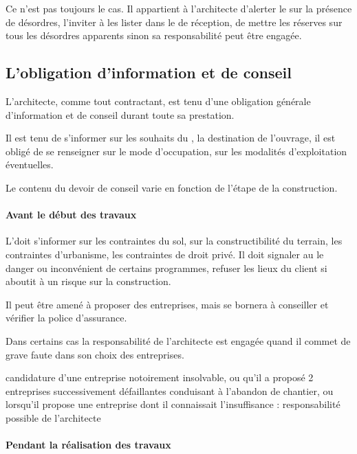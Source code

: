 		Ce n’est pas toujours le cas.
		Il appartient à l’architecte d’alerter le \Mo sur la présence de désordres, l’inviter à les lister dans le \pv de réception, de mettre les réserves sur tous les désordres apparents sinon sa responsabilité peut être engagée.

	\subsection{L'obligation d'information et de conseil}

		L’architecte, comme tout contractant, est tenu d’une obligation générale d’information et de conseil durant toute sa prestation.


		Il est tenu de s’informer sur les souhaits du \Mo, la destination de l’ouvrage, il est obligé de se renseigner sur le mode d’occupation, sur les modalités d’exploitation éventuelles.


		Le contenu du devoir de conseil varie en fonction de l’étape de la construction.


		\paragraph{Avant le début des travaux}
		L'\archi doit s'informer  sur les contraintes du sol, sur la constructibilité du terrain, les contraintes d’urbanisme, les contraintes de droit privé. Il doit signaler au \Mo le danger ou inconvénient de certains programmes, refuser les lieux du client si aboutit à un risque sur la construction.

		Il peut être amené à proposer des entreprises, mais se bornera à conseiller et vérifier la police d’assurance.


		Dans certains cas la responsabilité de l’architecte est engagée quand il commet de grave faute dans son choix des entreprises.
		\begin{exemple}
			candidature d’une entreprise notoirement insolvable, ou qu’il a proposé 2 entreprises successivement défaillantes conduisant à l’abandon de chantier, ou lorsqu’il propose une entreprise dont il connaissait l’insuffisance : responsabilité possible de l’architecte
		\end{exemple}

		\paragraph{Pendant la réalisation des travaux}

